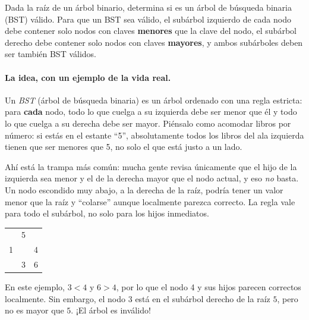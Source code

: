 
Dada la raíz de un árbol binario, determina si es un árbol de búsqueda binaria
(BST) válido. Para que un BST sea válido, el subárbol izquierdo de cada nodo
debe contener solo nodos con claves \textbf{menores} que la clave del nodo, el
subárbol derecho debe contener solo nodos con claves \textbf{mayores}, y ambos
subárboles deben ser también BST válidos.

\paragraph{La idea, con un ejemplo de la vida real.} Un \emph{BST} (árbol de
búsqueda binaria) es un árbol ordenado con una regla estricta: para \textbf{cada}
nodo, todo lo que cuelga a su izquierda debe ser menor que él y todo lo que
cuelga a su derecha debe ser mayor. Piénsalo como acomodar libros por número:
si estás en el estante ``5'', absolutamente todos los libros del ala izquierda
tienen que ser menores que 5, no solo el que está justo a un lado.

Ahí está la trampa más común: mucha gente revisa únicamente que el hijo de la
izquierda sea menor y el de la derecha mayor que el nodo actual, y eso
\emph{no} basta. Un nodo escondido muy abajo, a la derecha de la raíz, podría
tener un valor menor que la raíz y ``colarse'' aunque localmente parezca
correcto. La regla vale para todo el subárbol, no solo para los hijos
inmediatos.

\begin{center}
\ttfamily
\begin{tabular}{ccc}
 & 5 & \\
1 & & 4\\
 & 3 & 6\\
\end{tabular}
\end{center}

\noindent En este ejemplo, $3 < 4$ y $6 > 4$, por lo que el nodo 4 y sus hijos
parecen correctos localmente. Sin embargo, el nodo $3$ está en el subárbol
derecho de la raíz $5$, pero no es mayor que $5$. ¡El árbol es inválido!

